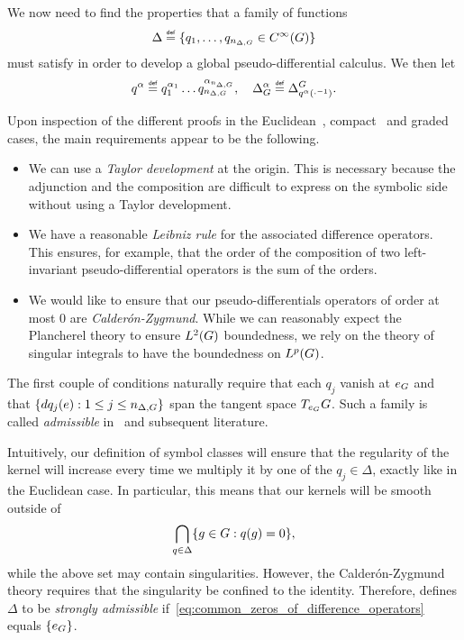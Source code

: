 We now need to find the properties that a family of functions
\begin{align*}
    \Delta \defeq \{q_1, \dots, q_{\dimDifferenceOperators} \in \SmoothFunctions \Group\}
\end{align*}
must satisfy in order to develop a global pseudo-differential calculus.
We then let
\begin{align*}
    q^\alpha \defeq q^{\alpha_1}_1 \dots q^{\alpha_{\dimDifferenceOperators}}_{\dimDifferenceOperators},   
    \quad \DifferenceOperatorOrder \alpha \defeq \DifferenceOperator {q^\alpha(\dummy^{-1})}.
\end{align*}

Upon inspection of the different proofs in the Euclidean~\cite{Stein93},
compact~\cite{RuzhanskyTurunen10,Fischer2015} and graded~\cite{FischerRuzhansky16} cases,
the main requirements appear to be the following.
\begin{itemize}
    \item We can use a \emph{Taylor development} at the origin.
        This is necessary because the adjunction and the composition are difficult to express on the symbolic side without using a Taylor development.
    \item We have a reasonable \emph{Leibniz rule} for the associated difference operators.
        This ensures, for example, that the order of the composition of two left-invariant pseudo-differential operators is the sum of the orders.
    \item We would like to ensure that our pseudo-differentials operators of order at most $0$ are \emph{Calder\'on-Zygmund}.
        While we can reasonably expect the Plancherel theory to ensure ${L^{2} (G)}$ boundedness,
        we rely on the theory of singular integrals to have the boundedness on ${L^{p} (G)}$.
\end{itemize}

The first couple of conditions naturally require that each $q_j$ vanish at $e_G$ and that $\{dq_j(e) : 1 \leq j \leq n_{\Delta, G}\}$ span the tangent space $T_{e_G} G$.
Such a family is called \emph{admissible} in~\cite{RuzhanskyTurunenWirth10} and subsequent literature.

Intuitively,
our definition of symbol classes will ensure that the regularity of the kernel will increase every time we multiply it by one of the $q_j \in \Delta$,
exactly like in the Euclidean case.
In particular,
this means that our kernels will be smooth outside of
\begin{align}
    \bigcap_{q \in \Delta} \{g \in G : q(g) = 0\},
    \label{eq:common_zeros_of_difference_operators}
\end{align}
while the above set may contain singularities.
However,
the Calder\'on-Zygmund theory requires that the singularity be confined to the identity.
Therefore,
\cite{RuzhanskyTurunenWirth10} defines $\Delta$ to be \emph{strongly admissible}
if~\eqref{eq:common_zeros_of_difference_operators} equals $\{e_G\}$.

